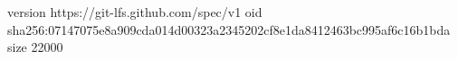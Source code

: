 version https://git-lfs.github.com/spec/v1
oid sha256:07147075e8a909cda014d00323a2345202cf8e1da8412463bc995af6c16b1bda
size 22000
